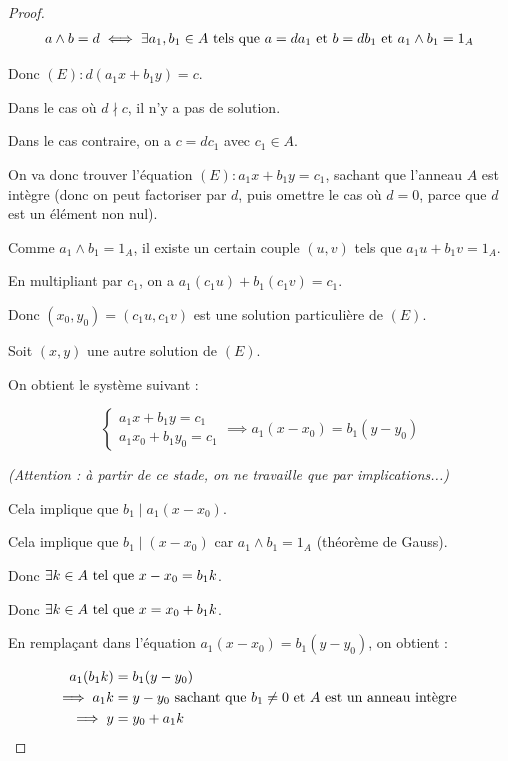 \documentclass[12pt, a4paper]{report}
\begin{document}
\begin{proof}
    \begin{align*}
        a \wedge b = d &\iff \exists a_1,b_1 \in A \text{ tels que } a = da_1 \text{ et } b = db_1 \text{ et } a_1 \wedge b_1 = 1_A\\
    \end{align*}

    Donc $(E) : d(a_1 x + b_1 y) = c$.

    Dans le cas où $d\nmid c$, il n'y a pas de solution.

    Dans le cas contraire, on a $c = d c_1$ avec $c_1 \in A$.

    On va donc trouver l'équation $(E) : a_1 x + b_1 y = c_1$, sachant que l'anneau $A$ est intègre (donc on peut factoriser par $d$, puis omettre le cas où $d=0$, parce que $d$ est un élément non nul).

    Comme $a_1 \wedge b_1 = 1_A$, il existe un certain couple $(u,v)$ tels que $a_1 u + b_1 v = 1_A$.

    En multipliant par $c_1$, on a $a_1 (c_1 u) + b_1 (c_1 v) = c_1$.

    Donc $(x_0,y_0) = (c_1 u, c_1 v)$ est une solution particulière de $(E)$.

    Soit $(x,y)$ une autre solution de $(E)$.

    On obtient le système suivant :

    $$\begin{cases}
    a_1 x + b_1 y = c_1\\
    a_1 x_0 + b_1 y_0 = c_1
    \end{cases}\implies
    a_1(x - x_0) = b_1 (y - y_0)
    $$

    \begin{center}
    \textit{(Attention : à partir de ce stade, on ne travaille que par implications...)}
    \end{center}

    Cela implique que $b_1 \mid a_1 (x - x_0)$.

    Cela implique que $b_1 \mid (x - x_0)$ car $a_1 \wedge b_1 = 1_A$ (théorème de Gauss).

    Donc $\exists k \in A \text{ tel que } x - x_0 = b_1 k$.

    Donc $\exists k \in A \text{ tel que } x = x_0 + b_1 k$.

    En remplaçant dans l'équation $a_1 (x - x_0) = b_1 (y - y_0)$, on obtient :

    \begin{align*}
        a_1 (b_1 k) &= b_1 (y - y_0)\\
        \implies a_1 k &= y - y_0 \text{ sachant que } b_1 \ne 0 \text{ et } A \text{ est un anneau intègre }\\
        \implies y &= y_0 + a_1 k
    \end{align*}


\end{proof}
\end{document}
